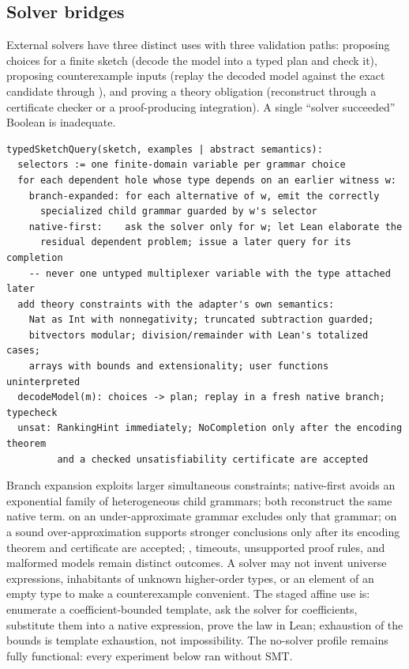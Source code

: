 \subsection{Solver bridges}

External solvers have three distinct uses with three validation paths: proposing choices for a finite sketch (decode the model into a typed plan and check it), proposing counterexample inputs (replay the decoded model against the exact candidate through ), and proving a theory obligation (reconstruct through a certificate checker or a proof-producing integration). A single ``solver succeeded'' Boolean is inadequate.

\begin{lstlisting}
typedSketchQuery(sketch, examples | abstract semantics):
  selectors := one finite-domain variable per grammar choice
  for each dependent hole whose type depends on an earlier witness w:
    branch-expanded: for each alternative of w, emit the correctly
      specialized child grammar guarded by w's selector
    native-first:    ask the solver only for w; let Lean elaborate the
      residual dependent problem; issue a later query for its completion
    -- never one untyped multiplexer variable with the type attached later
  add theory constraints with the adapter's own semantics:
    Nat as Int with nonnegativity; truncated subtraction guarded;
    bitvectors modular; division/remainder with Lean's totalized cases;
    arrays with bounds and extensionality; user functions uninterpreted
  decodeModel(m): choices -> plan; replay in a fresh native branch; typecheck
  unsat: RankingHint immediately; NoCompletion only after the encoding theorem
         and a checked unsatisfiability certificate are accepted
\end{lstlisting}
Branch expansion exploits larger simultaneous constraints; native-first avoids an exponential family of heterogeneous child grammars; both reconstruct the same native term.  on an under-approximate grammar excludes only that grammar;  on a sound over-approximation supports stronger conclusions only after its encoding theorem and certificate are accepted; , timeouts, unsupported proof rules, and malformed models remain distinct outcomes. A solver may not invent universe expressions, inhabitants of unknown higher-order types, or an element of an empty type to make a counterexample convenient. The staged affine use is: enumerate a coefficient-bounded template, ask the solver for coefficients, substitute them into a native expression, prove the law in Lean; exhaustion of the bounds is template exhaustion, not impossibility. The no-solver profile remains fully functional: every experiment below ran without SMT.


